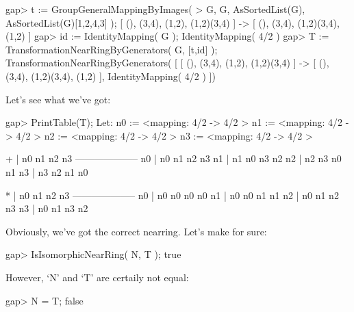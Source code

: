 \beginexample
    gap> t := GroupGeneralMappingByImages(                    
    >           G, G, AsSortedList(G), AsSortedList(G){[1,2,4,3]} );
    [ (), (3,4), (1,2), (1,2)(3,4) ] -> [ (), (3,4), (1,2)(3,4), (1,2) ]
    gap> id := IdentityMapping( G );
    IdentityMapping( 4/2 )
    gap> T := TransformationNearRingByGenerators( G, [t,id] );
    TransformationNearRingByGenerators(
    [ [ (), (3,4), (1,2), (1,2)(3,4) ] -> [ (), (3,4), (1,2)(3,4), (1,2) ], 
      IdentityMapping( 4/2 ) ])
\endexample

Let's see what we've got:

\beginexample
    gap> PrintTable(T);
    Let:
    n0 := <mapping: 4/2 -> 4/2 >
    n1 := <mapping: 4/2 -> 4/2 >
    n2 := <mapping: 4/2 -> 4/2 >
    n3 := <mapping: 4/2 -> 4/2 >

       +  | n0  n1  n2  n3  
      --------------------
      n0  | n0  n1  n2  n3  
      n1  | n1  n0  n3  n2  
      n2  | n2  n3  n0  n1  
      n3  | n3  n2  n1  n0  

       *  | n0  n1  n2  n3  
      --------------------
      n0  | n0  n0  n0  n0  
      n1  | n0  n0  n1  n1  
      n2  | n0  n1  n2  n3  
      n3  | n0  n1  n3  n2  
\endexample

Obviously, we've got the correct nearring.
Let's make for sure:

\beginexample
    gap> IsIsomorphicNearRing( N, T );
    true
\endexample

However, `N' and `T' are certaily not equal:

\beginexample
    gap> N = T;
    false
\endexample


